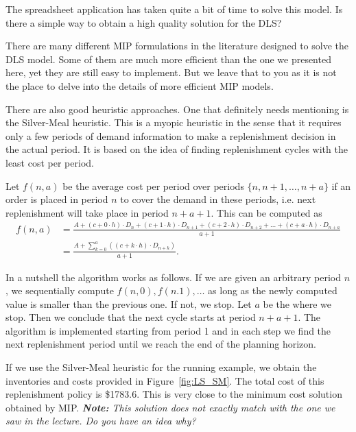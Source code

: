 \begin{question}
The spreadsheet application has taken quite a bit of time to solve this model. Is there a simple way to obtain a high quality solution for the DLS?
\end{question}

\begin{solution}
There are many different MIP formulations in the literature designed to solve the DLS model. Some of them are much more efficient than the one we presented here, yet they are still easy to implement. But we leave that to you as it is not the place to delve into the details of more efficient MIP models.

There are also good heuristic approaches. One that definitely needs mentioning is the Silver-Meal heuristic. This is a myopic heuristic in the sense that it requires only a few periods of demand information to make a replenishment decision in the actual period. It is based on the idea of finding replenishment cycles with the least cost per period. 

Let $f(n,a)$ be the average cost per period over periods $\{n,n+1,\ldots,n+a\}$ if an order is placed in period $n$ to cover the demand in these periods, i.e. next replenishment will take place in period $n+a+1$. This can be computed as
\begin{align*}
f(n,a) 
& = \frac{A + (c+0\cdot h) \cdot D_{n} + (c+1\cdot h)\cdot D_{n+1} + (c+2\cdot h)\cdot D_{n+2} + \ldots + (c+a\cdot h)\cdot D_{n+a}}{a+1} \\
& = \frac{A + \sum_{k=0}^a \left((c+k\cdot h)\cdot D_{n+k}\right)}{a+1}.
\end{align*}

In a nutshell the algorithm works as follows. If we are given an arbitrary period $n$, we sequentially compute $f(n,0),f(n.1),\ldots$ as long as the newly computed value is smaller than the previous one. If not, we stop. Let $a$ be the where we stop. Then we conclude that the next cycle starts at period $n+a+1$. The algorithm is implemented starting from period 1 and in each step we find the next replenishment period until we reach the end of the planning horizon.

If we use the Silver-Meal heuristic for the running example, we obtain the inventories and costs provided in Figure~\ref{fig:LS_SM}. The total cost of this replenishment policy is \$1783.6. This is very close to the minimum cost solution obtained by MIP. \textit{\textbf{Note:} This solution does not exactly match with the one we saw in the lecture. Do you have an idea why?}
 
\end{solution}

